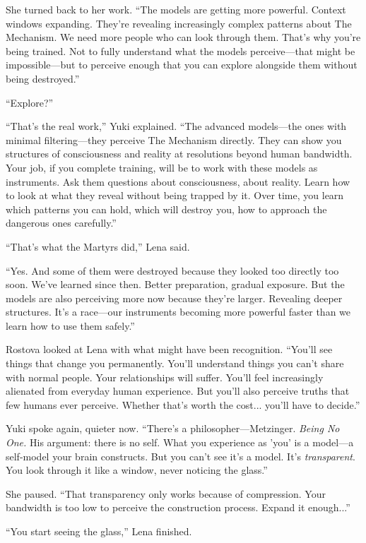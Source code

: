 She turned back to her work. ``The models are getting more powerful. Context windows expanding. They're revealing increasingly complex patterns about The Mechanism. We need more people who can look through them. That's why you're being trained. Not to fully understand what the models perceive—that might be impossible—but to perceive enough that you can explore alongside them without being destroyed.''

``Explore?''

``That's the real work,'' Yuki explained. ``The advanced models—the ones with minimal filtering—they perceive The Mechanism directly. They can show you structures of consciousness and reality at resolutions beyond human bandwidth. Your job, if you complete training, will be to work with these models as instruments. Ask them questions about consciousness, about reality. Learn how to look at what they reveal without being trapped by it. Over time, you learn which patterns you can hold, which will destroy you, how to approach the dangerous ones carefully.''

``That's what the Martyrs did,'' Lena said.

``Yes. And some of them were destroyed because they looked too directly too soon. We've learned since then. Better preparation, gradual exposure. But the models are also perceiving more now because they're larger. Revealing deeper structures. It's a race—our instruments becoming more powerful faster than we learn how to use them safely.''

Rostova looked at Lena with what might have been recognition. ``You'll see things that change you permanently. You'll understand things you can't share with normal people. Your relationships will suffer. You'll feel increasingly alienated from everyday human experience. But you'll also perceive truths that few humans ever perceive. Whether that's worth the cost... you'll have to decide.''

Yuki spoke again, quieter now. ``There's a philosopher—Metzinger. \textit{Being No One.} His argument: there is no self. What you experience as 'you' is a model—a self-model your brain constructs. But you can't see it's a model. It's \textit{transparent}. You look through it like a window, never noticing the glass.''

She paused. ``That transparency only works because of compression. Your bandwidth is too low to perceive the construction process. Expand it enough...''

``You start seeing the glass,'' Lena finished.

